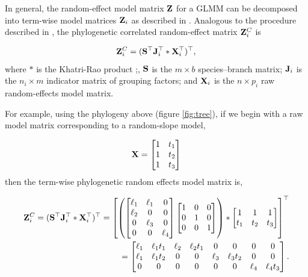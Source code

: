 \documentclass[12pt]{article}
\begin{document}
In general, the random-effect model matrix ${\mathbf Z}$ for a GLMM can be decomposed into term-wise model matrices ${\mathbf Z}_{i}$ as described in \citet{bates2015fitting}.
Analogous to the procedure described in \citet{bates2015fitting}, the phylogenetic correlated random-effect matrix ${\mathbf Z}^{C}_{i}$ is

\begin{equation}
{\mathbf Z}^{C}_{i} = ({\mathbf S}^{\top}{\mathbf J}^{\top}_{i} \ast {\mathbf X}^{\top}_{i})^{\top}, \label{eq:ZC}
\end{equation}
where $\ast$ is the Khatri-Rao product \citep{khatri1968solutions};, ${\mathbf S}$ is the $m \times b$ species--branch matrix; ${\mathbf J}_{i}$ is the $n_i \times m$ indicator matrix of grouping factors; and ${\mathbf X}_{i}$ is the $n \times p_{i}$ raw random-effects model matrix. 

For example, using the phylogeny above (figure \ref{fig:tree}), if we begin with a raw model matrix corresponding to a random-slope model, 

\begin{align}
{\mathbf X} = \begin{bmatrix}
1 & t_1  \\ 
1 & t_2  \\ 
1 & t_3 
\end{bmatrix} 
\end{align}
then the term-wise phylogenetic random effects model matrix is,

\begin{align}
{\mathbf Z}^{C}_{i} = ({\mathbf S}^{\top}{\mathbf J}^{\top}_{i} \ast {\mathbf X}^{\top}_{i})^{\top} =
\left[
\left(
\begin{bmatrix}
\ell_{1} & \ell_{1}  & 0 \\
\ell_{2} &  0  & 0 \\
0  &  \ell_{3} & 0 \\
0 & 0 &  \ell_{4} 
\end{bmatrix}
\begin{bmatrix}
1 & 0  & 0 \\
0 & 1  & 0 \\
0 & 0  & 1  
\end{bmatrix}
\right)
\ast
\begin{bmatrix}
1   & 1   & 1  \\ 
t_1 & t_2 & t_3
\end{bmatrix} 
\right]^{\top}
\\
= \begin{bmatrix}
\ell_{1} & \ell_{1}t_1 & \ell_{2} & \ell_{2}t_1 & 0 & 0 & 0 & 0 \\
\ell_{1} & \ell_{1}t_2 & 0 & 0 & \ell_{3} & \ell_{3}t_2 & 0 & 0 \\
0 & 0 & 0 & 0 & 0 & 0 & \ell_{4} & \ell_{4}t_3
\end{bmatrix}.
\end{align}
\end{document}
